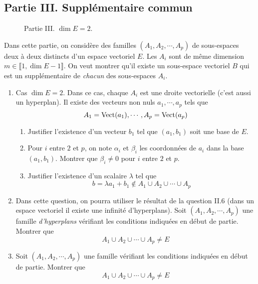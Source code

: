\subsection*{Partie III. Supplémentaire commun}
\begin{figure}[ht]
\centering
 
\caption{Partie III. $\dim E =2$.}
\label{fig:Ealglin20_1}
\end{figure}
Dans cette partie, on considère des familles $(A_1,A_2,\cdots,A_p)$ de sous-espaces deux à deux distincts d'un espace vectoriel $E$. Les $A_i$ sont de même dimension $m \in \llbracket 1, \dim E -1\rrbracket$. 
On veut montrer qu'il existe un sous-espace vectoriel $B$ qui est un supplémentaire de \emph{chacun} des sous-espaces $A_i$.
\begin{enumerate}
\item Cas $\dim E =2$. Dans ce cas, chaque $A_i$ est une droite vectorielle (c'est aussi un hyperplan). Il existe des vecteurs non nuls $a_1,\cdots,a_p$ tels que 
\begin{displaymath}
A_1 =\operatorname{Vect} (a_1), \cdots , A_p=\operatorname{Vect} (a_p) 
\end{displaymath}
\begin{enumerate}
 \item Justifier l'existence d'un vecteur $b_1$ tel que $(a_1,b_1)$ soit une base de $E$.
\item Pour $i$ entre $2$ et $p$, on note $\alpha_i$ et $\beta_i$ les coordonnées de $a_i$ dans la base $(a_1,b_1)$. Montrer que $\beta_i \neq 0$ pour $i$ entre $2$ et $p$.
\item Justifier l'existence d'un scalaire $\lambda$ tel que 
\begin{displaymath}
 b=\lambda a_1 + b_1 \not\in A_1\cup A_2\cup \cdots \cup A_p
\end{displaymath}
\end{enumerate}
\item Dans cette question, on pourra utiliser le résultat de la question II.6 (dans un espace vectoriel il existe une infinité d'hyperplans). Soit $(A_1,A_2,\cdots,A_p)$ une famille \emph{d'hyperplans} vérifiant les conditions indiquées en début de partie. Montrer que
\begin{displaymath}
 A_1\cup A_2\cup \cdots \cup A_p \neq E
\end{displaymath}
\item Soit $(A_1,A_2,\cdots,A_p)$ une famille vérifiant les conditions indiquées en début de partie. Montrer que
\begin{displaymath}
 A_1\cup A_2\cup \cdots \cup A_p \neq E

\end{displaymath}
\end{enumerate}
